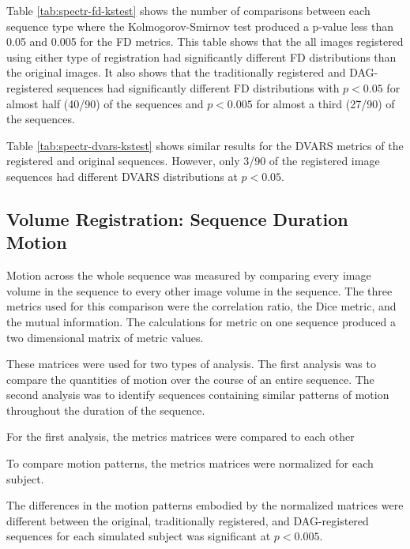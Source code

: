 Table \ref{tab:spectr-fd-kstest} shows the number of comparisons between each sequence type where the Kolmogorov-Smirnov test produced a p-value less than 0.05 and 0.005 for the FD metrics. This table shows that the all images registered using either type of registration had significantly different FD distributions than the original images. It also shows that the traditionally registered and DAG-registered sequences had significantly different FD distributions with $p < 0.05$ for almost half (40/90) of the sequences and $p < 0.005$ for almost a third (27/90) of the sequences.

Table \ref{tab:spectr-dvars-kstest} shows similar results for the DVARS metrics of the registered and original sequences. However, only 3/90 of the registered image sequences had different DVARS distributions at $p < 0.05$. 




\subsection{Volume Registration: Sequence Duration Motion}

Motion across the whole sequence was measured by comparing every image volume in the sequence to every other image volume in the sequence. The three metrics used for this comparison were the correlation ratio, the Dice metric, and the mutual information. The calculations for metric on one sequence produced a two dimensional matrix of metric values. 

These matrices were used for two types of analysis. The first analysis was to compare the quantities of motion over the course of an entire sequence. The second analysis was to identify sequences containing similar patterns of motion throughout the duration of the sequence.

For the first analysis, the metrics matrices were compared to each other 

To compare motion patterns, the metrics matrices were normalized for each subject.


The differences in the motion patterns embodied by the normalized matrices were different between the original, traditionally registered, and DAG-registered sequences for each simulated subject was significant at $p < 0.005$.

